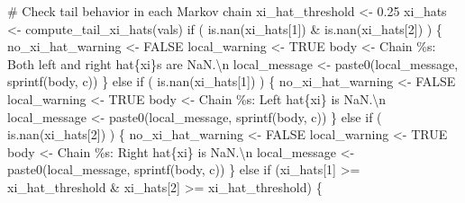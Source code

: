\documentclass[
  letterpaper,
  DIV=11,
  numbers=noendperiod]{scrartcl}
\newenvironment{Shaded}{\begin{snugshade}}{\end{snugshade}}
\newcommand{\CharTok}[1]{\textcolor[rgb]{0.13,0.47,0.30}{#1}}
\newcommand{\CommentTok}[1]{\textcolor[rgb]{0.37,0.37,0.37}{#1}}
\newcommand{\ControlFlowTok}[1]{\textcolor[rgb]{0.00,0.23,0.31}{#1}}
\newcommand{\DecValTok}[1]{\textcolor[rgb]{0.68,0.00,0.00}{#1}}
\newcommand{\FloatTok}[1]{\textcolor[rgb]{0.68,0.00,0.00}{#1}}
\newcommand{\KeywordTok}[1]{\textcolor[rgb]{0.00,0.23,0.31}{#1}}
\newcommand{\NormalTok}[1]{\textcolor[rgb]{0.00,0.23,0.31}{#1}}
\newcommand{\OperatorTok}[1]{\textcolor[rgb]{0.37,0.37,0.37}{#1}}
\newcommand{\SpecialCharTok}[1]{\textcolor[rgb]{0.37,0.37,0.37}{#1}}
\newcommand{\StringTok}[1]{\textcolor[rgb]{0.13,0.47,0.30}{#1}}
\begin{document}
\begin{Shaded}
\begin{Highlighting}[]
      \CommentTok{\# Check tail behavior in each Markov chain}
\NormalTok{      xi\_hat\_threshold }\OperatorTok{\textless{}{-}} \FloatTok{0.25}
\NormalTok{      xi\_hats }\OperatorTok{\textless{}{-}}\NormalTok{ compute\_tail\_xi\_hats(vals)}
      \ControlFlowTok{if}\NormalTok{ ( }\KeywordTok{is}\NormalTok{.nan(xi\_hats[}\DecValTok{1}\NormalTok{]) }\OperatorTok{\&} \KeywordTok{is}\NormalTok{.nan(xi\_hats[}\DecValTok{2}\NormalTok{]) ) \{}
\NormalTok{        no\_xi\_hat\_warning }\OperatorTok{\textless{}{-}}\NormalTok{ FALSE}
\NormalTok{        local\_warning }\OperatorTok{\textless{}{-}}\NormalTok{ TRUE}
\NormalTok{        body }\OperatorTok{\textless{}{-}} \StringTok{\textquotesingle{}  Chain }\SpecialCharTok{\%s}\StringTok{: Both left and right hat}\SpecialCharTok{\{xi\}}\StringTok{s are NaN.}\CharTok{\textbackslash{}n}\StringTok{\textquotesingle{}}
\NormalTok{        local\_message }\OperatorTok{\textless{}{-}}\NormalTok{ paste0(local\_message, sprintf(body, c))}
\NormalTok{      \}}
      \ControlFlowTok{else} \ControlFlowTok{if}\NormalTok{ ( }\KeywordTok{is}\NormalTok{.nan(xi\_hats[}\DecValTok{1}\NormalTok{]) ) \{}
\NormalTok{        no\_xi\_hat\_warning }\OperatorTok{\textless{}{-}}\NormalTok{ FALSE}
\NormalTok{        local\_warning }\OperatorTok{\textless{}{-}}\NormalTok{ TRUE}
\NormalTok{        body }\OperatorTok{\textless{}{-}} \StringTok{\textquotesingle{}  Chain }\SpecialCharTok{\%s}\StringTok{: Left hat}\SpecialCharTok{\{xi\}}\StringTok{ is NaN.}\CharTok{\textbackslash{}n}\StringTok{\textquotesingle{}}
\NormalTok{        local\_message }\OperatorTok{\textless{}{-}}\NormalTok{ paste0(local\_message, sprintf(body, c))}
\NormalTok{      \} }\ControlFlowTok{else} \ControlFlowTok{if}\NormalTok{ ( }\KeywordTok{is}\NormalTok{.nan(xi\_hats[}\DecValTok{2}\NormalTok{]) ) \{}
\NormalTok{        no\_xi\_hat\_warning }\OperatorTok{\textless{}{-}}\NormalTok{ FALSE}
\NormalTok{        local\_warning }\OperatorTok{\textless{}{-}}\NormalTok{ TRUE}
\NormalTok{        body }\OperatorTok{\textless{}{-}} \StringTok{\textquotesingle{}  Chain }\SpecialCharTok{\%s}\StringTok{: Right hat}\SpecialCharTok{\{xi\}}\StringTok{ is NaN.}\CharTok{\textbackslash{}n}\StringTok{\textquotesingle{}}
\NormalTok{        local\_message }\OperatorTok{\textless{}{-}}\NormalTok{ paste0(local\_message, sprintf(body, c))}
\NormalTok{      \} }\ControlFlowTok{else} \ControlFlowTok{if}\NormalTok{ (xi\_hats[}\DecValTok{1}\NormalTok{] }\OperatorTok{\textgreater{}=}\NormalTok{ xi\_hat\_threshold }\OperatorTok{\&} 
\NormalTok{          xi\_hats[}\DecValTok{2}\NormalTok{] }\OperatorTok{\textgreater{}=}\NormalTok{ xi\_hat\_threshold) \{}

\end{Highlighting}
\end{Shaded}
\end{document}
